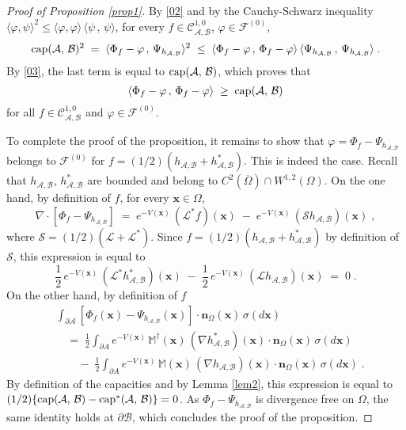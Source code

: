 \documentclass[reqno]{amsart}
\newcounter{as}[section]
\newcommand{\mc}[1]{{\mathcal #1}}
\newcommand{\bb}[1]{{\mathbb #1}}
\newcommand{\bs}[1]{{\boldsymbol #1}}
\newcommand{\<}{\langle}
\renewcommand{\>}{\rangle}
\renewcommand{\Cap}{{\rm cap}}
\begin{document}
\begin{proof}[Proof of Proposition \ref{prop1}]
By \eqref{02} and by the Cauchy-Schwarz inequality
$\< \varphi , \psi \>^2 \le \< \varphi , \varphi \> \,\< \psi \,,\, \psi \> $, for every $f\in \mathcal C^{1,0}_{\mc A,\mc B}$, $\varphi \in \mathcal F^{(0)}$,
\begin{equation*}
\Cap (\mc A,\,\mc B)^2 \;=\; \<\Phi_f - \varphi \,,\, \Psi_{h_{\mc A,\mc B}}\>^2 \;\le\;
\<\Phi_f - \varphi \,,\, \Phi_f - \varphi \> \,
\< \Psi_{h_{\mc A,\mc B}} \,,\, \Psi_{h_{\mc A,\mc B}}\> \;.
\end{equation*}
By \eqref{03}, the last term is equal to $\Cap (\mc A,\,\mc B)$, which proves
that
\begin{equation*}
\<\Phi_f - \varphi \,,\, \Phi_f - \varphi \> \;\ge\; \Cap (\mc A,\,\mc B)
\end{equation*}
for all $f\in \mathcal C^{1,0}_{\mc A,\mc B}$ and $\varphi \in \mathcal F^{(0)}$.

To complete the proof of the proposition, it remains to show that
$\varphi = \Phi_f - \Psi_{h_{\mc A,\mc B}}$ belongs to $\mathcal F^{(0)}$ for
$f = (1/2) (h_{\mc A,\mc B} + h^*_{\mc A,\mc B})$. This is indeed the case. Recall
that $h_{\mc A,\mc B}$, $h^*_{\mc A,\mc B}$ are bounded and belong to
$C^2(\overline{\Omega})\cap W^{1,2}(\Omega)$. On the one hand, by
definition of $f$, for every $\bs x\in \Omega$,
\begin{equation*}
\nabla \cdot [\Phi_f - \Psi_{h_{\mc A,\mc B}}] \;=\;
e^{-V(\bs{x})} \, (\mathcal L^* f)(\bs{x}) \;-\;
e^{-V(\bs{x})} \, (\mathcal S h_{\mc A,\mc B})(\bs{x}) \;,
\end{equation*}
where $\mathcal S = (1/2) (\mathcal L + \mathcal L^*)$.  Since $f= (1/2) (h_{\mc A,\mc B} +
h^*_{\mc A,\mc B})$ by definition of $\mathcal S$, this expression is equal to
\begin{equation*}
\frac 12 \, e^{-V(\bs{x})} \, (\mathcal L^* h^*_{\mc A,\mc B})(\bs{x}) \;-\;
\frac 12 \, e^{-V(\bs{x})} \, (\mathcal L h_{\mc A,\mc B})(\bs{x}) \;=\; 0 \;.
\end{equation*}
On the other hand, by definition of $f$
\begin{align*}
& \int_{\partial \mc A} [\Phi_f (\bs{x}) - \Psi_{h_{\mc A,\mc B}} (\bs{x})] \cdot \bs n_{\Omega}(\bs{x}) \,
\sigma(d\bs{x}) \\
&\quad  =\; \frac 12 \int_{\partial A} e^{-V(\bs{x})} \, \bb M^\dagger(\bs{x}) \,
(\nabla h_{\mc A,\mc B}^*)(\bs{x}) \cdot \bs n_{\Omega}(\bs{x}) \, \sigma(d\bs{x}) \\
&\qquad -\; \frac 12 \int_{\partial A} e^{-V(\bs{x})} \, \bb M(\bs{x}) \,
(\nabla h_{\mc A,\mc B})(\bs{x}) \cdot \bs n_{\Omega}(\bs{x}) \, \sigma(d\bs{x})\;.
\end{align*}
By definition of the capacities and by Lemma \ref{lem2}, this
expression is equal to $(1/2)\{\Cap (\mc A,\,\mc B) - \Cap^* (\mc A,\,\mc B)\}=0$.  As
$\Phi_f - \Psi_{h_{\mc A,\mc B}}$ is divergence free on $\Omega$, the same
identity holds at $\partial \mc B$, which concludes the proof of the
proposition.
\end{proof}
\end{document}
